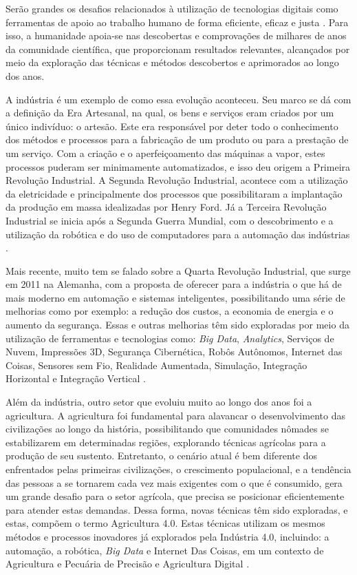 \documentclass[12pt]{article}
\begin{document}
Serão grandes os desafios relacionados à utilização de tecnologias digitais como ferramentas de apoio ao trabalho humano de forma eficiente, eficaz e justa \cite{Rose:2019}. Para isso, a humanidade apoia-se nas descobertas e comprovações de milhares de anos da comunidade científica, que proporcionam resultados relevantes, alcançados por meio da exploração das técnicas e métodos descobertos e aprimorados ao longo dos anos.

A indústria é um exemplo de como essa evolução aconteceu. Seu marco se dá com a definição da Era Artesanal, na qual, os bens e serviços eram criados por um único indivíduo: o artesão. Este era responsável por deter todo o conhecimento dos métodos e processos para a fabricação de um produto ou para a prestação de um serviço. Com a criação e o aperfeiçoamento das máquinas a vapor, estes processos puderam ser minimamente automatizados, e isso deu origem a Primeira Revolução Industrial. A Segunda Revolução Industrial, acontece com a utilização da eletricidade e principalmente dos processos que possibilitaram a implantação da produção em massa idealizadas por Henry Ford. Já a Terceira Revolução Industrial se inicia após a Segunda Guerra Mundial, com o descobrimento e a utilização da robótica e do uso de computadores para a automação das indústrias \cite{Souza:2017}.

Mais recente, muito tem se falado sobre a Quarta Revolução Industrial, que surge em 2011 na Alemanha, com a proposta de oferecer para a indústria o que há de mais moderno em automação e sistemas inteligentes, possibilitando uma série de melhorias como por exemplo: a redução dos custos, a economia de energia e o aumento da segurança. Essas e outras melhorias têm sido exploradas por meio da utilização de ferramentas e tecnologias como: \textit{Big Data}, \textit{Analytics}, Serviços de Nuvem, Impressões 3D, Segurança Cibernética, Robôs Autônomos, Internet das Coisas, Sensores sem Fio, Realidade Aumentada, Simulação, Integração Horizontal e Integração Vertical \cite{Souza:2017}.

Além da indústria, outro setor que evoluiu muito ao longo dos anos foi a agricultura. A agricultura foi fundamental para alavancar o desenvolvimento das civilizações ao longo da história, possibilitando que comunidades nômades se estabilizarem em determinadas regiões, explorando técnicas agrícolas para a produção de seu sustento. Entretanto, o cenário atual é bem diferente dos enfrentados pelas primeiras civilizações, o crescimento populacional, e a tendência das pessoas a se tornarem cada vez mais exigentes com o que é consumido, gera um grande desafio para o setor agrícola, que precisa se posicionar eficientemente para atender estas demandas. Dessa forma, novas técnicas têm sido exploradas, e estas, compõem o termo Agricultura 4.0. Estas técnicas utilizam os mesmos métodos e processos inovadores já explorados pela Indústria 4.0, incluindo: a automação, a robótica, \textit{Big Data} e Internet Das Coisas, em um contexto de Agricultura e Pecuária de Precisão e Agricultura Digital \cite{Ribeiro:2018}.
\end{document}
